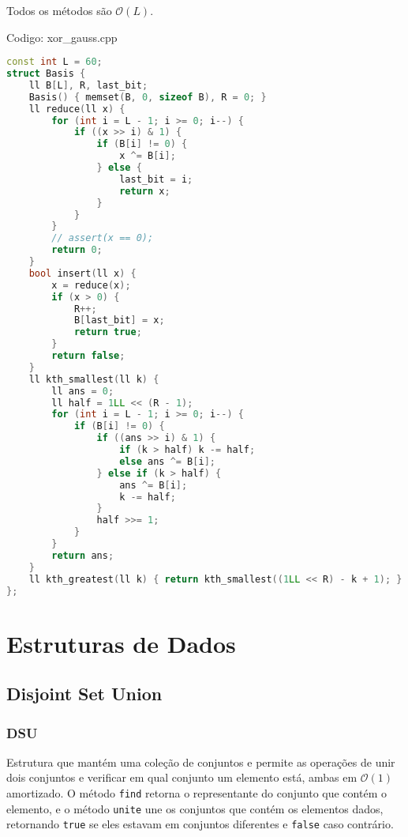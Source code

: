 \documentclass[10pt, a4paper, oneside]{book}
\begin{document}
Todos os métodos são $\mathcal{O}(L)$.
\hfill

Codigo: xor\_gauss.cpp

\begin{lstlisting}[language=C++]
const int L = 60;
struct Basis {
    ll B[L], R, last_bit;
    Basis() { memset(B, 0, sizeof B), R = 0; }
    ll reduce(ll x) {
        for (int i = L - 1; i >= 0; i--) {
            if ((x >> i) & 1) {
                if (B[i] != 0) {
                    x ^= B[i];
                } else {
                    last_bit = i;
                    return x;
                }
            }
        }
        // assert(x == 0);
        return 0;
    }
    bool insert(ll x) {
        x = reduce(x);
        if (x > 0) {
            R++;
            B[last_bit] = x;
            return true;
        }
        return false;
    }
    ll kth_smallest(ll k) {
        ll ans = 0;
        ll half = 1LL << (R - 1);
        for (int i = L - 1; i >= 0; i--) {
            if (B[i] != 0) {
                if ((ans >> i) & 1) {
                    if (k > half) k -= half;
                    else ans ^= B[i];
                } else if (k > half) {
                    ans ^= B[i];
                    k -= half;
                }
                half >>= 1;
            }
        }
        return ans;
    }
    ll kth_greatest(ll k) { return kth_smallest((1LL << R) - k + 1); }
};
\end{lstlisting}
\hfill

\newpage

%
%
%
%

\chapter{Estruturas de Dados}

\section{Disjoint Set Union}
\subsection{DSU}


Estrutura que mantém uma coleção de conjuntos e permite as operações de unir dois conjuntos e verificar em qual conjunto um elemento está, ambas em $\mathcal{O}(1)$ amortizado. O método \texttt{find} retorna o representante do conjunto que contém o elemento, e o método \texttt{unite} une os conjuntos que contém os elementos dados, retornando \texttt{true} se eles estavam em conjuntos diferentes e \texttt{false} caso contrário.
\end{document}
